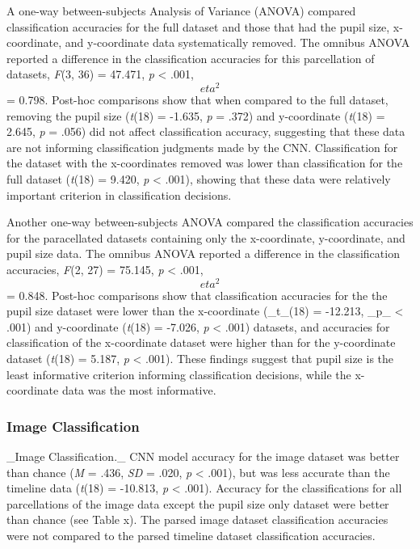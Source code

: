 A one-way between-subjects Analysis of Variance (ANOVA) compared classification accuracies for the full dataset and those that had the pupil size, x-coordinate, and y-coordinate data systematically removed. The omnibus ANOVA reported a difference in the classification accuracies for this parcellation of datasets, \textit{F}(3, 36) = 47.471, \textit{p} < .001, \textit{\[eta^{2}\]} = 0.798. Post-hoc comparisons show that when compared to the full dataset, removing the pupil size (\textit{t}(18) = -1.635, \textit{p} = .372) and y-coordinate (\textit{t}(18) = 2.645, \textit{p} = .056) did not affect classification accuracy, suggesting that these data are not informing classification judgments made by the CNN. Classification for the dataset with the x-coordinates removed was lower than classification for the full dataset (\textit{t}(18) = 9.420, \textit{p} < .001), showing that these data were relatively important criterion in classification decisions.

Another one-way between-subjects ANOVA compared the classification accuracies for the paracellated datasets containing only the x-coordinate, y-coordinate, and pupil size data. The omnibus ANOVA reported a difference in the classification accuracies, \textit{F}(2, 27) = 75.145, \textit{p} < .001, \textit{\[eta^{2}\]} = 0.848. Post-hoc comparisons show that classification accuracies for the the pupil size dataset were lower than the x-coordinate (_t_(18) = -12.213, _p_ < .001) and y-coordinate (\textit{t}(18) = -7.026, \textit{p} < .001) datasets, and accuracies for classification of the x-coordinate dataset were higher than for the y-coordinate dataset (\textit{t}(18) = 5.187, \textit{p} < .001). These findings suggest that pupil size is the least informative criterion informing classification decisions, while the x-coordinate data was the most informative.

\subsubsection{Image Classification}
_Image Classification._ CNN model accuracy for the image dataset was better than chance (\textit{M} = .436, \textit{SD} = .020, \textit{p} < .001), but was less accurate than the timeline data (\textit{t}(18) = -10.813, \textit{p} < .001). Accuracy for the classifications for all parcellations of the image data except the pupil size only dataset were better than chance (see Table x). The parsed image dataset classification accuracies were not compared to the parsed timeline dataset classification accuracies.

